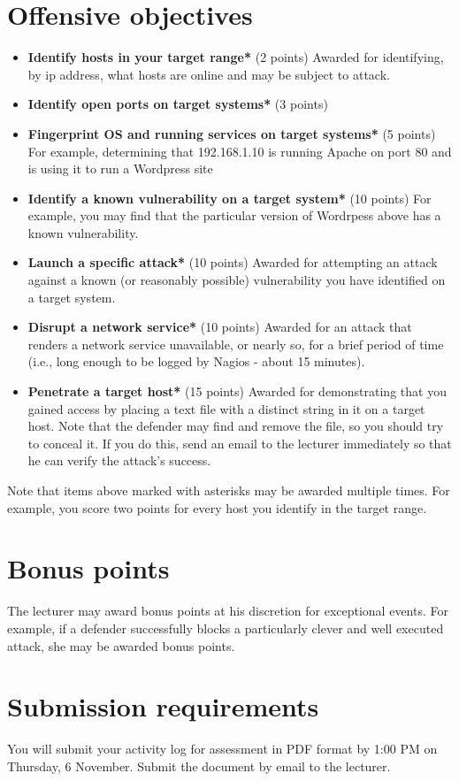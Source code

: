 \documentclass{article}   	%
\begin{document}
\section*{Offensive objectives}
\begin{itemize}
  \item \textbf{Identify hosts in your target range*} (2 points)  Awarded for identifying, by ip address, what hosts are online and may be subject to attack.
  \item \textbf{Identify open ports on target systems*} (3 points)  
  \item \textbf{Fingerprint OS and running services on target systems*} (5 points) For example, determining that 192.168.1.10 is running Apache on port 80 and is using it to run a Wordpress site
  \item \textbf{Identify a known vulnerability on a target system*} (10 points) For example, you may find that the particular version of Wordrpess above has a known vulnerability.
  \item \textbf{Launch a specific attack*} (10 points) Awarded for attempting an attack against a known (or reasonably possible) vulnerability you have identified on a target system.
  \item \textbf{Disrupt a network service*} (10 points) Awarded for an attack that renders a network service unavailable, or nearly so, for a brief period of time (i.e., long enough to be logged by Nagios - about 15 minutes).
  \item \textbf{Penetrate a target host*} (15 points) Awarded for demonstrating that you gained access by placing a text file with a distinct string in it on a target host.  Note that the defender may find and remove the file, so you should try to conceal it. If you do this, send an email to the lecturer immediately so that he can verify the attack's success.
  
\end{itemize}

Note that items above marked  with asterisks may be awarded multiple times. For example, you score two points for every host you identify in the target range.

\section*{Bonus points}
The lecturer may award bonus points at his discretion for exceptional events.  For example, if a defender successfully blocks a particularly clever and well executed attack, she may be awarded bonus points.

\section*{Submission requirements} You will submit your activity log for assessment in PDF format by 1:00 PM on Thursday, 6 November.  Submit the document by email to the lecturer.
\end{document}
